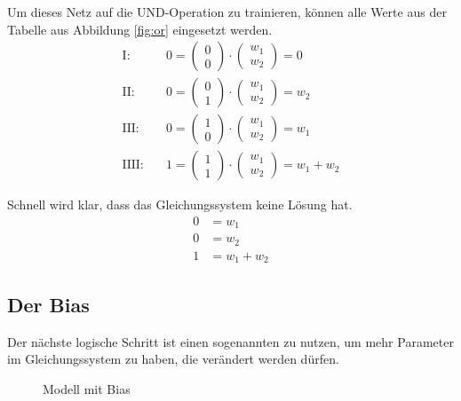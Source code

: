 \documentclass[a4paper]{report}
\begin{document}
Um dieses Netz auf die UND-Operation zu trainieren, können alle Werte aus der Tabelle aus Abbildung \ref{fig:or} eingesetzt werden.
\begin{align}
    \text{I:}&\quad 0=\begin{pmatrix}
        0 \\
        0
    \end{pmatrix}\cdot
    \begin{pmatrix}
        w_1 \\
        w_2
    \end{pmatrix}=0 \\
    \text{II:}&\quad 0=\begin{pmatrix}
        0 \\
        1
    \end{pmatrix}\cdot
    \begin{pmatrix}
        w_1 \\
        w_2
    \end{pmatrix}=w_2 \\
    \text{III:}&\quad 0=\begin{pmatrix}
        1 \\
        0
    \end{pmatrix}\cdot
    \begin{pmatrix}
        w_1 \\
        w_2
    \end{pmatrix}=w_1 \\
    \text{IIII:}&\quad 1=\begin{pmatrix}
        1 \\
        1
    \end{pmatrix}\cdot
    \begin{pmatrix}
        w_1 \\
        w_2
    \end{pmatrix}=w_1+w_2
\end{align}

Schnell wird klar, dass das Gleichungssystem keine Lösung hat.
\begin{align}
    0&=w_1 \\
    0&=w_2 \\
    1&=w_1+w_2
\end{align}

\subsection{Der Bias}
Der nächste logische Schritt ist einen sogenannten  zu nutzen, um mehr Parameter im Gleichungssystem zu haben, die verändert werden dürfen.
\begin{figure}[ht]
    \centering
    \caption{Modell mit Bias}
    \label{fig:net1}
\end{figure}
\end{document}
